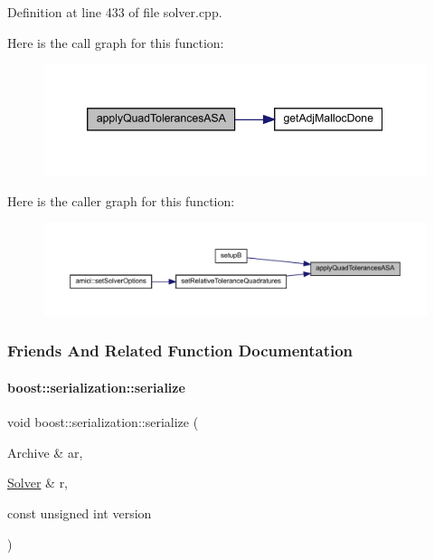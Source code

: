Definition at line 433 of file solver.\+cpp.

Here is the call graph for this function\+:
\nopagebreak
\begin{figure}[H]
\begin{center}
\leavevmode
\includegraphics[width=346pt]{classamici_1_1_solver_a09d47957ba70f725efb5e3a385a274a6_cgraph}
\end{center}
\end{figure}
Here is the caller graph for this function\+:
\nopagebreak
\begin{figure}[H]
\begin{center}
\leavevmode
\includegraphics[width=350pt]{classamici_1_1_solver_a09d47957ba70f725efb5e3a385a274a6_icgraph}
\end{center}
\end{figure}


\subsubsection{Friends And Related Function Documentation}
\mbox{\label{classamici_1_1_solver_af5aefbc0a968aeae501d6d7f753ee2a4}} 
\paragraph{\texorpdfstring{boost::serialization::serialize}{boost::serialization::serialize}}
{\footnotesize\ttfamily void boost\+::serialization\+::serialize (\begin{DoxyParamCaption}\item[{Archive \&}]{ar,  }\item[{\mbox{\hyperlink{classamici_1_1_solver}{Solver}} \&}]{r,  }\item[{const unsigned int}]{version }\end{DoxyParamCaption})\hspace{0.3cm}{\ttfamily [friend]}}



